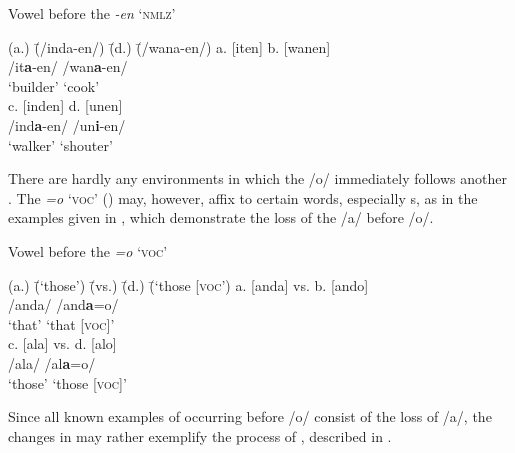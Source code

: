 \ea%
    \label{ex:phon:72}
          Vowel  before the   \textit{-en} ‘\textsc{nmlz}’\\
\begin{tabbing}    
{(a.)} \= {(/inda-en/)} \= {(d.)} \= {(/wana-en/)}\kill
{a.} \> {[iten]} \> {b.} \> {[wanen]}\\
{ } \> {/it\textbf{a}-en/} \> { } \> {/wan\textbf{a}-en/}\\
{ } \> {‘builder’} \> { } \> {‘cook’}\\
{c.} \> {[inden]} \> {d.} \> {[unen]}\\
{ } \> {/ind\textbf{a}-en/} \> { } \> {/un\textbf{i}-en/}\\
{ } \> {‘walker’} \> { } \> {‘shouter’}
\end{tabbing}
\z


There are hardly any environments in which the  /o/ immediately follows another . The   \textit{=o} ‘\textsc{voc}’ () may, however, affix to certain words, especially s, as in the examples given in , which demonstrate the loss of the  /a/ before /o/.

\ea%
    \label{ex:phon:73}
          Vowel  before the   \textit{=o} ‘\textsc{voc}’\\
\begin{tabbing}    
{(a.)} \= {(‘those’)} \= {(vs.)} \= {(d.)} \= {(‘those [\textsc{voc}’)}\kill
{a.} \> {[anda]} \> {vs.} \> {b.} \> {[ando]}\\
{ } \> {/anda/} \> { } \> { } \> {/and\textbf{a}=o/}\\
{ } \> {‘that’} \> { } \> { } \> {‘that [\textsc{voc}]’}\\
{c.} \> {[ala]} \> {vs.} \> {d.} \> {[alo]}\\
{ } \> {/ala/} \> { } \> { } \> {/al\textbf{a}=o/}\\
{ } \> {‘those’} \> { } \> { } \> {‘those [\textsc{voc}]’}
\end{tabbing}
\z

Since all known examples of  occurring before /o/ consist of the loss of /a/, the changes in  may rather exemplify the process of  , described in .


